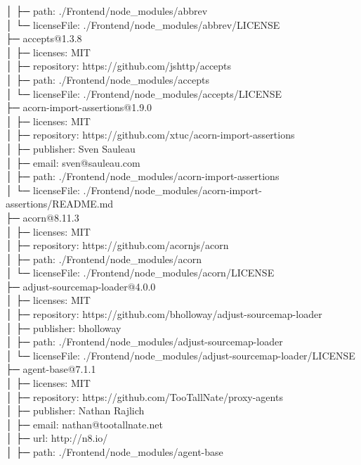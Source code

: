 │  ├─ path: ./Frontend/node\_modules/abbrev\\
│  └─ licenseFile: ./Frontend/node\_modules/abbrev/LICENSE\\
├─ accepts@1.3.8\\
│  ├─ licenses: MIT\\
│  ├─ repository: https://github.com/jshttp/accepts\\
│  ├─ path: ./Frontend/node\_modules/accepts\\
│  └─ licenseFile: ./Frontend/node\_modules/accepts/LICENSE\\
├─ acorn-import-assertions@1.9.0\\
│  ├─ licenses: MIT\\
│  ├─ repository: https://github.com/xtuc/acorn-import-assertions\\
│  ├─ publisher: Sven Sauleau\\
│  ├─ email: sven@sauleau.com\\
│  ├─ path: ./Frontend/node\_modules/acorn-import-assertions\\
│  └─ licenseFile: ./Frontend/node\_modules/acorn-import-assertions/README.md\\
├─ acorn@8.11.3\\
│  ├─ licenses: MIT\\
│  ├─ repository: https://github.com/acornjs/acorn\\
│  ├─ path: ./Frontend/node\_modules/acorn\\
│  └─ licenseFile: ./Frontend/node\_modules/acorn/LICENSE\\
├─ adjust-sourcemap-loader@4.0.0\\
│  ├─ licenses: MIT\\
│  ├─ repository: https://github.com/bholloway/adjust-sourcemap-loader\\
│  ├─ publisher: bholloway\\
│  ├─ path: ./Frontend/node\_modules/adjust-sourcemap-loader\\
│  └─ licenseFile: ./Frontend/node\_modules/adjust-sourcemap-loader/LICENSE\\
├─ agent-base@7.1.1\\
│  ├─ licenses: MIT\\
│  ├─ repository: https://github.com/TooTallNate/proxy-agents\\
│  ├─ publisher: Nathan Rajlich\\
│  ├─ email: nathan@tootallnate.net\\
│  ├─ url: http://n8.io/\\
│  ├─ path: ./Frontend/node\_modules/agent-base\\
